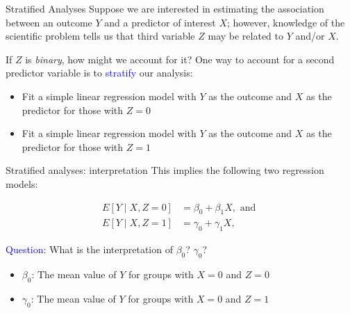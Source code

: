 \documentclass[10pt,t]{beamer}
\begin{document}
\begin{frame}{Stratified Analyses}
Suppose we are interested in estimating the association between an outcome $Y$ and a predictor of interest $X$; however, knowledge of the scientific problem tells us that third variable $Z$ may be related to $Y$ and/or $X$.

\vspace{0.3cm}

If $Z$ is \textit{binary}, how might we account for it? \pause One way to account for a second predictor variable is to \textcolor{blue}{stratify} our analysis:

\vspace{0.3cm}

\begin{itemize}
	\item Fit a simple linear regression model with $Y$ as the outcome and $X$ as the predictor for those with $Z = 0$
	\item Fit a simple linear regression model with $Y$ as the outcome and $X$ as the predictor for those with $Z = 1$
\end{itemize}
\end{frame}

\begin{frame}{Stratified analyses: interpretation}
This implies the following two regression models:

\begin{align*}
E[Y \mid X, Z = 0] & = \beta_0 + \beta_1 X, \text{ and } \\
E[Y \mid X, Z = 1] & = \gamma_0 + \gamma_1 X,
\end{align*} \pause

\textcolor{blue}{Question}: What is the interpretation of $\beta_0$? $\gamma_0$? \pause

\vspace{0.3cm}

\begin{itemize}
	\item $\beta_0$: The mean value of $Y$ for groups with $X  = 0$ and $Z = 0$ \pause
	\item $\gamma_0$: The mean value of $Y$ for groups with $X = 0$ and $Z = 1$
\end{itemize}
\end{frame}
\end{document}

